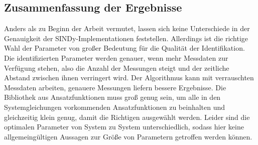 \subsection{Zusammenfassung der Ergebnisse}
Anders als zu Beginn der Arbeit vermutet, lassen sich keine Unterschiede in der Genauigkeit der SINDy-Implementationen feststellen. Allerdings ist die richtige Wahl der Parameter von großer Bedeutung für die Qualität der Identifikation. Die identifizierten Parameter werden genauer, wenn mehr Messdaten zur Verfügung stehen, also die Anzahl der Messungen steigt und der zeitliche Abstand zwischen ihnen verringert wird. Der Algorithmus kann mit verrauschten Messdaten arbeiten, genauere Messungen liefern bessere Ergebnisse. Die Bibliothek aus Ansatzfunktionen muss groß genug sein, um alle in den Systemgleichungen vorkommenden Ansatzfunktionen zu beinhalten und gleichzeitig klein genug, damit die Richtigen ausgewählt werden. Leider sind die optimalen Parameter von System zu System unterschiedlich, sodass hier keine allgemeingültigen Aussagen zur Größe von Parametern getroffen werden können.

